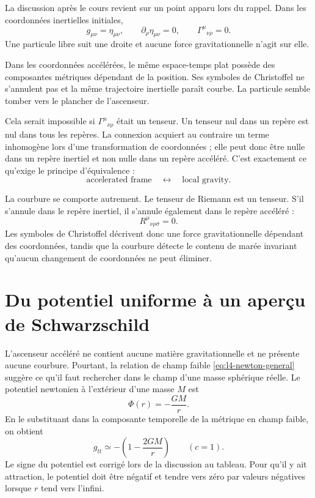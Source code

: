 La discussion après le cours revient sur un point apparu lors du rappel. Dans les coordonnées inertielles initiales,
\begin{equation}
g_{\mu\nu}=\eta_{\mu\nu},
\qquad
\partial_\rho\eta_{\mu\nu}=0,
\qquad
\Gamma^\mu{}_{\nu\rho}=0.
\end{equation}
Une particule libre suit une droite et aucune force gravitationnelle n’agit sur elle.

Dans les coordonnées accélérées, le même espace-temps plat possède des composantes métriques dépendant de la position. Ses symboles de Christoffel ne s’annulent pas et la même trajectoire inertielle paraît courbe. La particule semble tomber vers le plancher de l’ascenseur.

Cela serait impossible si \(\Gamma^\mu{}_{\nu\rho}\) était un tenseur. Un tenseur nul dans un repère est nul dans tous les repères. La connexion acquiert au contraire un terme inhomogène lors d’une transformation de coordonnées ; elle peut donc être nulle dans un repère inertiel et non nulle dans un repère accéléré. C’est exactement ce qu’exige le principe d’équivalence :
\begin{equation}
\text{accelerated frame}
\quad\longleftrightarrow\quad
\text{local gravity}.
\end{equation}

La courbure se comporte autrement. Le tenseur de Riemann est un tenseur. S’il s’annule dans le repère inertiel, il s’annule également dans le repère accéléré :
\begin{equation}
R^\mu{}_{\nu\rho\sigma}=0.
\end{equation}
Les symboles de Christoffel décrivent donc une force gravitationnelle dépendant des coordonnées, tandis que la courbure détecte le contenu de marée invariant qu’aucun changement de coordonnées ne peut éliminer.

\section{Du potentiel uniforme à un aperçu de Schwarzschild}

L’ascenseur accéléré ne contient aucune matière gravitationnelle et ne présente aucune courbure. Pourtant, la relation de champ faible \eqref{eq:l4-newton-general} suggère ce qu’il faut rechercher dans le champ d’une masse sphérique réelle. Le potentiel newtonien à l’extérieur d’une masse \(M\) est
\begin{equation}
\Phi(r)=-\frac{GM}{r}.
\label{eq:l4-newton-potential}
\end{equation}
En le substituant dans la composante temporelle de la métrique en champ faible, on obtient
\begin{equation}
g_{tt}
\simeq
-\left(1-\frac{2GM}{r}\right)
\qquad(c=1).
\label{eq:l4-schwarzschild-preview}
\end{equation}
Le signe du potentiel est corrigé lors de la discussion au tableau. Pour qu’il y ait attraction, le potentiel doit être négatif et tendre vers zéro par valeurs négatives lorsque \(r\) tend vers l’infini.

